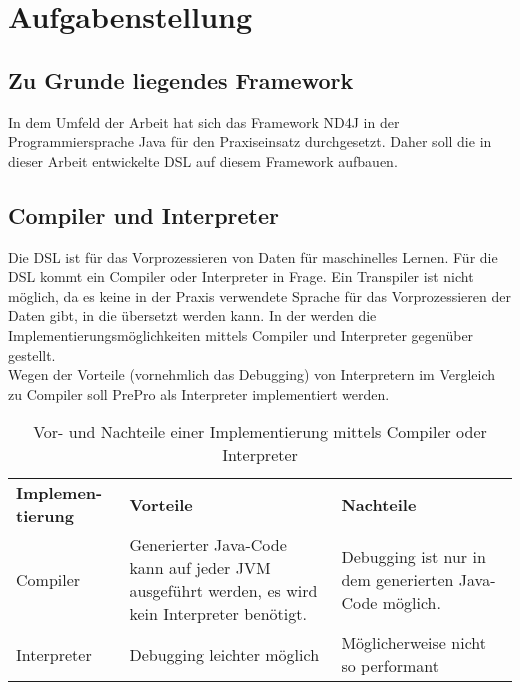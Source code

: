 \chapter{Aufgabenstellung}
\section{Zu Grunde liegendes Framework}
In dem Umfeld der Arbeit hat sich das Framework ND4J in der Programmiersprache Java für den Praxiseinsatz durchgesetzt.
Daher soll die in dieser Arbeit entwickelte \ac{DSL} auf diesem Framework aufbauen.

\section{Compiler und Interpreter}
Die \ac{DSL} ist für das Vorprozessieren von Daten für maschinelles Lernen.
Für die \ac{DSL} kommt ein Compiler oder Interpreter in Frage.
Ein Transpiler ist nicht möglich, da es keine in der Praxis verwendete Sprache für das Vorprozessieren der Daten gibt, in die übersetzt werden kann.
In der  werden die Implementierungsmöglichkeiten mittels Compiler und Interpreter gegenüber gestellt.\\
Wegen der Vorteile (vornehmlich das Debugging) von Interpretern im Vergleich zu Compiler soll PrePro als Interpreter implementiert werden.

\begin{table}[H]
	\centering
	\begin{tabular}{ | p{3cm} | p{6cm} | p{6cm} | }
		\hline \rowcolor{gray!15}
		\textbf{Implemen-tierung} & \textbf{Vorteile} & \textbf{Nachteile} \\ \hhline{|=|=|=|}
		Compiler & Generierter Java-Code kann auf jeder \ac{JVM} ausgeführt werden, es wird kein Interpreter benötigt. & Debugging ist nur in dem generierten Java-Code möglich. \\ \hline
		Interpreter & Debugging leichter möglich & Möglicherweise nicht so performant \\ \hline
	\end{tabular}
	\caption{Vor- und Nachteile einer Implementierung mittels Compiler oder Interpreter}
	\label{tab:Vorteile_Compiler_Interpreter}
\end{table}

